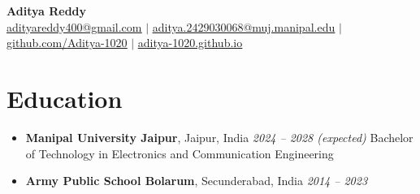 \documentclass[letterpaper,11pt]{article}
\begin{document}
\begin{center}
    \textbf{\Huge Aditya Reddy} \\ \vspace{1pt}
    \small \href{mailto:adityareddy400@gmail.com}{\underline{adityareddy400@gmail.com}} $|$ 
    \href{mailto:aditya.2429030068@muj.manipal.edu}{\underline{aditya.2429030068@muj.manipal.edu}} $|$
    \href{https://github.com/Aditya-1020}{\underline{github.com/Aditya-1020}} $|$
    \href{https://aditya-1020.github.io}{\underline{aditya-1020.github.io}}
\end{center}

\section{Education}
\begin{itemize}[leftmargin=*, itemsep=1pt]
  \item \textbf{Manipal University Jaipur}, Jaipur, India \hfill \textit{2024 -- 2028 (expected)}  
  \newline Bachelor of Technology in Electronics and Communication Engineering
  \item \textbf{Army Public School Bolarum}, Secunderabad, India \hfill \textit{2014 -- 2023}
\end{itemize}


\end{document}
